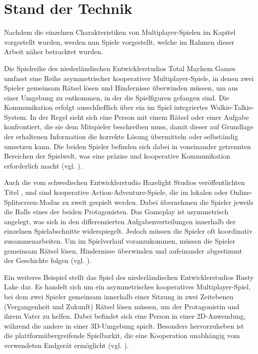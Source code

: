 \chapter{Stand der Technik} \label{sec:sota}
Nachdem die einzelnen Charakteristiken von Multiplayer-Spielen im Kapitel \emph{} vorgestellt wurden, werden nun Spiele vorgestellt, welche im Rahmen dieser Arbeit näher betrachtet wurden.

Die Spielreihe  des niederländischen Entwicklerstudios Total Mayhem Games umfasst eine Reihe asymmetrischer kooperativer Multiplayer-Spiele, in denen zwei Spieler gemeinsam Rätsel lösen und Hindernisse überwinden müssen, um aus einer Umgebung zu entkommen, in der die Spielfiguren gefangen sind. Die Kommunikation erfolgt ausschließlich über ein im Spiel integriertes Walkie-Talkie-System. In der Regel sieht sich eine Person mit einem Rätsel oder einer Aufgabe konfrontiert, die sie dem Mitspieler beschreiben muss, damit dieser auf Grundlage der erhaltenen Information die korrekte Lösung übermitteln oder selbständig umsetzen kann. Die beiden Spieler befinden sich dabei in voneinander getrennten Bereichen der Spielwelt, was eine präzise und kooperative Kommunikation erforderlich macht (vgl. \citealp{total_mayhem_games_we_2017,total_mayhem_games_we_2018}).  

Auch die vom schwedischen Entwicklerstudio Hazelight Studios veröffentlichten Titel ,  und   sind kooperative Action-Adventure-Spiele, die im lokalen oder Online-Splitscreen-Modus zu zweit gespielt werden. Dabei übernehmen die Spieler jeweils die Rolle eines der beiden Protagonisten. Das Gameplay ist asymmetrisch angelegt, was sich in den differenzierten Aufgabenverteilungen innerhalb der einzelnen Spielabschnitte widerspiegelt. Jedoch müssen die Spieler oft koordinativ zusammenarbeiten. Um im Spielverlauf voranzukommen, müssen die Spieler gemeinsam Rätsel lösen, Hindernisse überwinden und aufeinander abgestimmt der Geschichte folgen (vgl. \citealp{hazelight_studios_way_2018,hazelight_studios_it_2021,hazelight_studios_split_2025}).

Ein weiteres Beispiel stellt das Spiel  des niederländischen Entwicklerstudios Rusty Lake dar. Es handelt sich um ein asymmetrisches kooperatives Multiplayer-Spiel, bei dem zwei Spieler gemeinsam innerhalb einer Sitzung in zwei Zeitebenen (Vergangenheit und Zukunft) Rätsel lösen müssen, um der Protagonistin und ihrem Vater zu helfen. Dabei befindet sich eine Person in einer \ac{2D}-Anwendung, während die andere in einer \ac{3D}-Umgebung spielt. Besonders hervorzuheben ist die plattformübergreifende Spielbarkit, die eine Kooperation unabhängig vom verwendeten Endgerät ermöglicht (vgl. \citealp{rusty_lake_past_2022}). 

